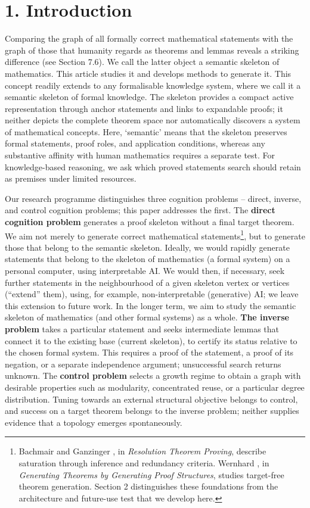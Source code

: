 \documentclass[pdflatex,sn-basic,Numbered]{sn-jnl}
\begin{document}
\section*{1. Introduction}\label{introduction}

Comparing the graph of all formally correct mathematical statements with the graph of those that humanity regards as theorems and lemmas \citep{MetamathSetMMPinned} reveals a striking difference (see Section 7.6). We call the latter object a semantic skeleton of mathematics. This article studies it and develops methods to generate it. This concept readily extends to any formalisable knowledge system, where we call it a semantic skeleton of formal knowledge. The skeleton provides a compact active representation through anchor statements and links to expandable proofs; it neither depicts the complete theorem space nor automatically discovers a system of mathematical concepts. Here, `semantic' means that the skeleton preserves formal statements, proof roles, and application conditions, whereas any substantive affinity with human mathematics requires a separate test. For knowledge-based reasoning, we ask which proved statements search should retain as premises under limited resources.

Our research programme distinguishes three cognition problems -- direct, inverse, and control cognition problems; this paper addresses the first. The \textbf{direct cognition problem} generates a proof skeleton without a final target theorem. We aim not merely to generate correct mathematical statements\footnote{Bachmair and Ganzinger \citep{BachmairGanzinger2001}, in \emph{Resolution Theorem Proving}, describe saturation through inference and redundancy criteria. Wernhard \citep{Wernhard2026}, in \emph{Generating Theorems by Generating Proof Structures}, studies target-free theorem generation. Section 2 distinguishes these foundations from the architecture and future-use test that we develop here.}, but to generate those that belong to the semantic skeleton. Ideally, we would rapidly generate statements that belong to the skeleton of mathematics (a formal system) on a personal computer, using interpretable AI. We would then, if necessary, seek further statements in the neighbourhood of a given skeleton vertex or vertices (``extend'' them), using, for example, non-interpretable (generative) AI; we leave this extension to future work. In the longer term, we aim to study the semantic skeleton of mathematics (and other formal systems) as a whole. \textbf{The inverse problem} takes a particular statement and seeks intermediate lemmas that connect it to the existing base (current skeleton), to certify its status relative to the chosen formal system. This requires a proof of the statement, a proof of its negation, or a separate independence argument; unsuccessful search returns unknown. The \textbf{control problem} selects a growth regime to obtain a graph with desirable properties such as modularity, concentrated reuse, or a particular degree distribution. Tuning towards an external structural objective belongs to control, and success on a target theorem belongs to the inverse problem; neither supplies evidence that a topology emerges spontaneously.
\end{document}
